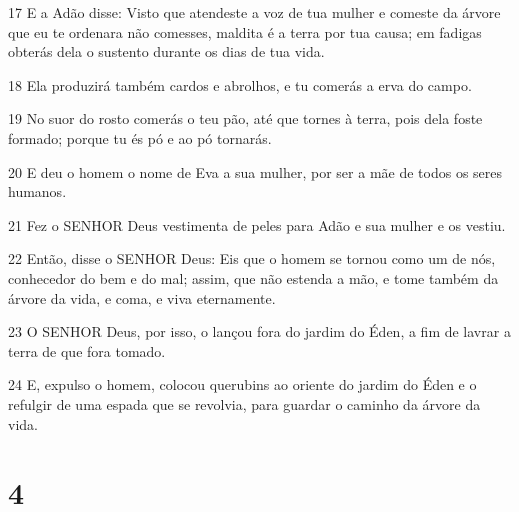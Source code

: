\par 17 E a Adão disse: Visto que atendeste a voz de tua mulher e comeste da árvore que eu te ordenara não comesses, maldita é a terra por tua causa; em fadigas obterás dela o sustento durante os dias de tua vida.
\par 18 Ela produzirá também cardos e abrolhos, e tu comerás a erva do campo.
\par 19 No suor do rosto comerás o teu pão, até que tornes à terra, pois dela foste formado; porque tu és pó e ao pó tornarás.
\par 20 E deu o homem o nome de Eva a sua mulher, por ser a mãe de todos os seres humanos.
\par 21 Fez o SENHOR Deus vestimenta de peles para Adão e sua mulher e os vestiu.
\par 22 Então, disse o SENHOR Deus: Eis que o homem se tornou como um de nós, conhecedor do bem e do mal; assim, que não estenda a mão, e tome também da árvore da vida, e coma, e viva eternamente.
\par 23 O SENHOR Deus, por isso, o lançou fora do jardim do Éden, a fim de lavrar a terra de que fora tomado.
\par 24 E, expulso o homem, colocou querubins ao oriente do jardim do Éden e o refulgir de uma espada que se revolvia, para guardar o caminho da árvore da vida.

\chapter{4}

